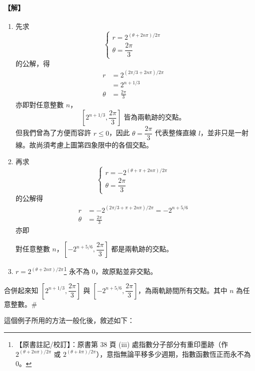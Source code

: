 \paragraph{【解】}
\begin{enumerate}[label=(\roman*), leftmargin=2.5em]
\item 先求
\[
\begin{cases}
r = 2^{(\theta + 2n\pi) / 2\pi} \\[4pt]
\theta = \dfrac{2\pi}{3}
\end{cases}
\]
的公解，得
\[
\begin{aligned}
r &= 2^{(2\pi / 3 + 2n\pi) / 2\pi} \\
  &= 2^{n + 1/3} \\[4pt]
\theta &= \frac{2\pi}{3}
\end{aligned}
\]
亦即\qquad 對任意整數 $n$，
\[
\left[2^{n + 1/3}, \frac{2\pi}{3}\right] \text{ 皆為兩軌跡的交點。}
\]
但我們曾為了方便而容許 $r \le 0$，因此 $\theta = \dfrac{2\pi}{3}$ 代表整條直線 $l$，並非只是一射線。故尚須考慮上圖第四象限中的各個交點。

\item 再求
\[
\begin{cases}
r = -2^{(\theta + \pi + 2n\pi) / 2\pi} \\[4pt]
\theta = \dfrac{2\pi}{3}
\end{cases}
\]
的公解得
\[
\begin{aligned}
r &= -2^{(2\pi / 3 + \pi + 2n\pi) / 2\pi} = -2^{n + 5/6} \\[4pt]
\theta &= \frac{2\pi}{3}
\end{aligned}
\]
亦即

\qquad 對任意整數 $n$，$\left[-2^{n + 5/6}, \dfrac{2\pi}{3}\right]$ 都是兩軌跡的交點。

\item $r = 2^{(\theta + 2n\pi) / 2\pi}$\label{note:b5-ch1-p38-exp}\footnote{【原書註記/校訂】：原書第 38 頁 (iii) 處指數分子部分有重印墨跡（作 $2^{(\theta + 2n\pi)/2\pi}$ 或 $2^{(\theta + k\pi)/2\pi}$），意指無論平移多少週期，指數函數恆正而永不為 $0$。} 永不為 $0$，故原點並非交點。
\end{enumerate}

合併起來知 $\left[2^{n + 1/3}, \dfrac{2\pi}{3}\right]$ 與 $\left[-2^{n + 5/6}, \dfrac{2\pi}{3}\right]$，為兩軌跡間所有交點。其中 $n$ 為任意整數。\hfill$\#$

\medskip
這個例子所用的方法一般化後，敘述如下：

